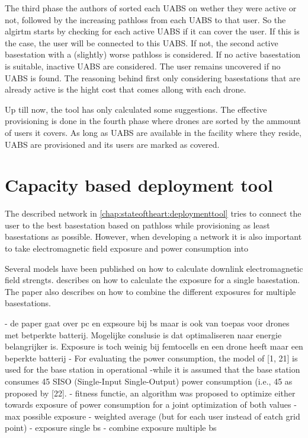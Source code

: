 The third phase the authors of \cite{J2} sorted each \gls{UABS} on wether they were active or not, followed by the increasing pathloss from each \gls{UABS} to that user.
So the algirtm starts by checking for each active \gls{UABS} if it can cover the user. If this is the case, the user will be connected to this \gls{UABS}. If not,
the second active basestation with a (slightly) worse pathloss is considered. If no active basestation is suitable, inactive \gls{UABS} are considered. The user remains uncovered if no \gls{UABS}
is found. The reasoning behind first only considering basestations that are already active is the hight cost that comes allong with each drone.

Up till now, the tool has only calculated some suggestions. The effective provisioning is done in the fourth phase where drones are sorted by the ammount of users it covers. As long as \gls{UABS}
are available in the facility where they reside, \gls{UABS} are provisioned and its users are marked as covered.


\section{Capacity based deployment tool}
\label{chap:capbaseddeploymenttool}

The described network in \ref{chap:stateoftheart:deploymenttool} tries to connect the user to the best basestation based on pathloss while provisioning as least basestations as possible.
However, when developing a network it is also important to take electromagnetic field exposure and power consumption into 

Several models have been published on how to calculate downlink electromagnetic field strengts. \cite{J1} describes on how to calculate the exposure for a single basestation.
The paper also describes on how to combine the different exposures for multiple basestations. 

- de paper gaat over pc en expsoure bij bs maar is ook van toepas voor drones met betperkte batterij. Mogelijke conslusie is dat optimaliseren naar 
energie belangrijker is. Exposure is toch weinig bij femtocells en een drone heeft maar een beperkte batterij
- For evaluating the power consumption, the model of [1, 21] is used for the base station in operational
-while it is assumed
that the base station consumes 45%
SISO (Single-Input Single-Output) power consumption
(i.e., 45%
as proposed by [22].
- fitness functie, an algorithm was proposed to optimize either towards exposure of power consumption for a joint optimization of both values
- max possible exposure
- weighted average (but for each user instead of eatch grid point)
- exposure single bs
- combine exposure multiple bs

